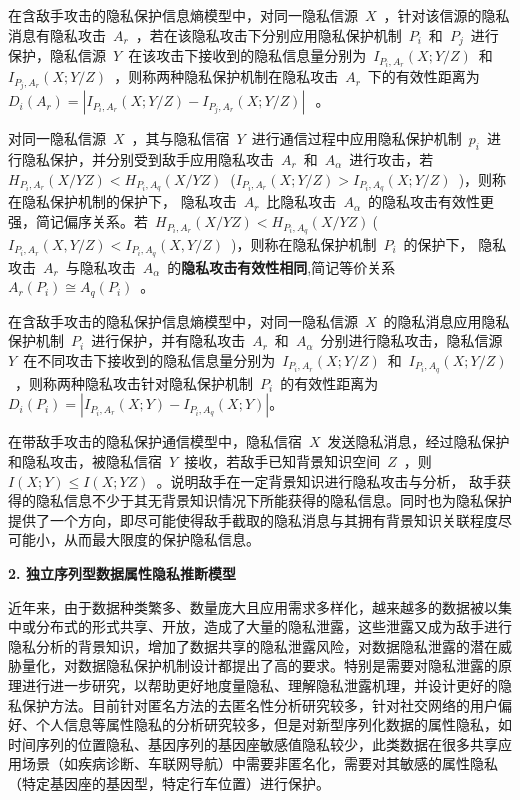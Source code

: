 \documentclass[pdftex,notypeinfo,twoside,openany,UTF8,fntef]{CASthesis}
\theoremstyle{THrm}{
	\newtheorem{question}{Question}[section]
	\newtheorem{property}{性质}[section]
	\newtheorem{assumption}{假设}[section]
	\newtheorem{claim}[lemma]{断言}
	
}
\begin{document}
在含敌手攻击的隐私保护信息熵模型中，对同一隐私信源~$X$~，针对该信源的隐私消息有隐私攻击~$A_{r}$~，若在该隐私攻击下分别应用隐私保护机制~$P_{i}$~和~$P_{j}$~进行保护，隐私信源~$Y$~在该攻击下接收到的隐私信息量分别为~$I_{P_{i},A_{r}}(X;Y/Z)$~和~$I_{P_{j},A_{r}}(X;Y/Z)$~，则称两种隐私保护机制在隐私攻击~$A_{r}$~下的有效性距离为~$D_{i}(A_{r})=\left | I_{P_{i},A_{r}}(X;Y/Z)-I_{P_{j},A_{r}}(X;Y/Z) \right |~$~。

对同一隐私信源~$X$~，其与隐私信宿~$Y$~进行通信过程中应用隐私保护机制~$p_{i}$~进行隐私保护，并分别受到敌手应用隐私攻击~$A_{r}$~和~$A_{\alpha }$~进行攻击，若~${{H}_{{{P}_{i}},{{A}_{r}}}}(X/YZ)<{{H}_{{{P}_{i}},{{A}_{q}}}}(X/YZ)~$ (${{I}_{{{P}_{i}},{{A}_{r}}}}(X;Y/Z)>{{I}_{{{P}_{i}},{{A}_{q}}}}(X;Y/Z)$~)，则称在隐私保护机制的保护下， 隐私攻击~$A_{r}$~比隐私攻击~$A_{\alpha }$~的隐私攻击有效性更强，简记偏序关系。若~$H_{P_{i},A_{r}}(X/YZ)<H_{P_{i},A_{q}}(X/YZ)~$(~$I_{P_{i},A_{r}}(X,Y/Z)<I_{P_{i},A_{q}}(X,Y/Z)$~)，则称在隐私保护机制~$P_{i}$~的保护下， 隐私攻击~$A_{r}$~与隐私攻击~$A_{\alpha }$~的\textbf{隐私攻击有效性相同},简记等价关系~$A_{r}(P_{i})\cong A_{q}(P_{i})$~。

在含敌手攻击的隐私保护信息熵模型中，对同一隐私信源~$X$~的隐私消息应用隐私保护机制~$P_{i}$~进行保护，并有隐私攻击~$A_{r}$~和~$A_{\alpha}$~分别进行隐私攻击，隐私信源~$Y$~在不同攻击下接收到的隐私信息量分别为~$I_{P_{i},A_{r}}(X;Y/Z)$~和~$I_{P_{i},A_{q}}(X;Y/Z)$~，则称两种隐私攻击针对隐私保护机制~$P_{i}$~的有效性距离为
$D_{i}(P_{i})=\left | I_{P_{i},A_{r}}(X;Y)-I_{P_{i},A_{q}}(X;Y) \right |$。

在带敌手攻击的隐私保护通信模型中，隐私信宿~$X$~发送隐私消息，经过隐私保护和隐私攻击，被隐私信宿~$Y$~接收，若敌手已知背景知识空间~$Z$~，则~$I(X;Y)\leqslant I(X;YZ)$~。说明敌手在一定背景知识进行隐私攻击与分析， 敌手获得的隐私信息不少于其无背景知识情况下所能获得的隐私信息。同时也为隐私保护提供了一个方向，即尽可能使得敌手截取的隐私消息与其拥有背景知识关联程度尽可能小，从而最大限度的保护隐私信息。
	
\textbf{2.	独立序列型数据属性隐私推断模型}

近年来，由于数据种类繁多、数量庞大且应用需求多样化，越来越多的数据被以集中或分布式的形式共享、开放，造成了大量的隐私泄露，这些泄露又成为敌手进行隐私分析的背景知识，增加了数据共享的隐私泄露风险，对数据隐私泄露的潜在威胁量化，对数据隐私保护机制设计都提出了高的要求。特别是需要对隐私泄露的原理进行进一步研究，以帮助更好地度量隐私、理解隐私泄露机理，并设计更好的隐私保护方法。目前针对匿名方法的去匿名性分析研究较多，针对社交网络的用户偏好、个人信息等属性隐私的分析研究较多，但是对新型序列化数据的属性隐私，如时间序列的位置隐私、基因序列的基因座敏感值隐私较少，此类数据在很多共享应用场景（如疾病诊断、车联网导航）中需要非匿名化，需要对其敏感的属性隐私（特定基因座的基因型，特定行车位置）进行保护。
\end{document}
